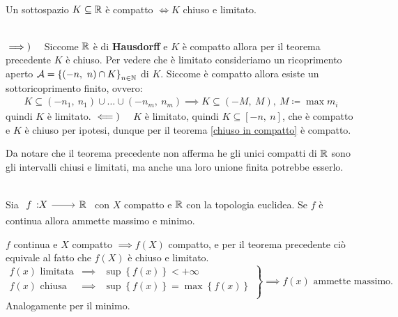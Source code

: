 \begin{theorema}~{}\\ \label{compatto chiuso e limitato R}
	Un sottospazio $K\subseteq \mathbb{R}$ è compatto $\iff K$ chiuso e limitato.
\end{theorema}
\begin{demonstration}~{}\\
	$\implies)\quad$ Siccome $\mathbb{R}$ è di \textbf{Hausdorff} e $K$ è compatto allora per il teorema precedente $K$ è chiuso.\newline
	Per vedere che è limitato consideriamo un ricoprimento aperto $\mathcal{A}=\left\{ (-n,\ n)\cap K\right\}_{n\in\mathbb{N}}$ di $K$. Siccome è compatto allora esiste un sottoricoprimento finito, ovvero:
	\begin{gather*}
		K\subseteq (-n_1,\ n_1)\cup\dots\cup(-n_m,\ n_m) \implies K\subseteq (-M,\ M), \ M\coloneqq \max m_i
	\end{gather*}
	quindi $K$ è limitato. \newline
	$\impliedby)\quad $ $K$ è limitato, quindi $K\subseteq [-n, \ n]$, che è compatto e $K$ è chiuso per ipotesi, dunque per il teorema \ref{chiuso in compatto} è compatto.
\end{demonstration}
\begin{observe}
	Da notare che il teorema precedente non afferma he gli unici compatti di $\mathbb{R}$ sono gli intervalli chiusi e limitati, ma anche una loro unione finita potrebbe esserlo.
\end{observe}

\begin{theorema}~{}\\ \label{weierstrass}
	Sia $\funz f X \realset$ con $X$ compatto e $\mathbb{R}$ con la topologia euclidea. Se $f$ è continua allora ammette massimo e minimo.
\end{theorema}
\begin{demonstration}
	$f$ continua e $X$ compatto $\implies f(X)$ compatto, e per il teorema precedente ciò equivale al fatto che $f(X)$ è chiuso e limitato.
	\begin{equation*}
		\left.
		\begin{array}{lcl}
			f\left(x\right)\text{ limitata}&\implies& \sup \left\{f\left(x\right)\right\}<+\infty\\
			f\left(x\right)\text{ chiusa}&\implies& \sup \left\{f\left(x\right)\right\}=\max \left\{f\left(x\right)\right\}\\
		\end{array}
		\right\}
		\implies f\left(x\right)\text{ ammette massimo.}
	\end{equation*}
	Analogamente per il minimo.
\end{demonstration}

